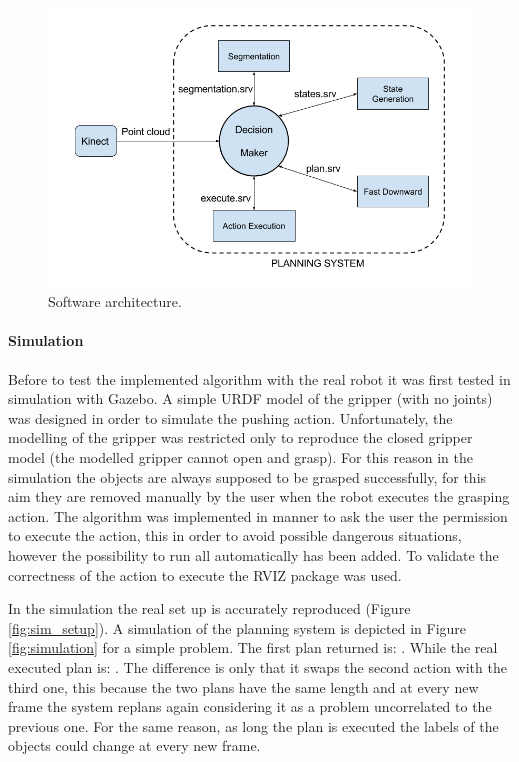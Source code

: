\begin{figure}[h]
\centering
\includegraphics[width=14cm]{Img/software/Software_arquitecture.png}
\caption{Software architecture.}\label{fig:architecture}
\end{figure}


\paragraph{Simulation}
Before to test the implemented algorithm with the real robot it was first tested in simulation with Gazebo\citep{koenig2004design}. A simple URDF model of the gripper (with no joints) was designed in order to simulate the pushing action. Unfortunately, the modelling of the gripper was restricted only to reproduce the closed gripper model (the modelled gripper cannot open and grasp). For this reason in the simulation the objects are always supposed to be grasped successfully, for this aim they are removed manually by the user when the robot executes the grasping action. The algorithm was implemented in manner to ask the user the permission to execute the action, this in order to avoid possible dangerous situations, however the possibility to run all automatically has been added. To validate the correctness of the action to execute the RVIZ package\citep{RVIZ} was used.  

In the simulation the real set up is accurately reproduced (Figure \ref{fig:sim_setup}). A simulation of the planning system is depicted in Figure \ref{fig:simulation} for a simple problem.
The first plan returned is: . While the real executed plan is: . The difference is only that it swaps the second action with the third one, this because the two plans have the same length and at every new frame the system replans again considering it as a problem uncorrelated to the previous one. For the same reason, as long the plan is executed the labels of the objects could change at every new frame. %

